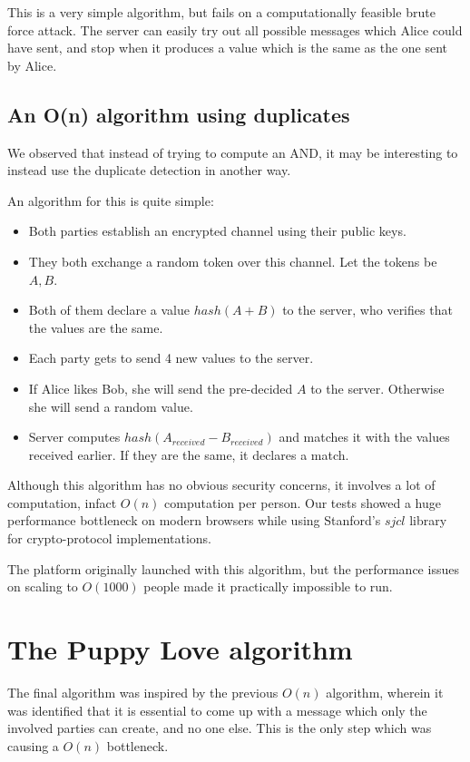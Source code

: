 \documentclass[sigtbd]{sigtbd-style}
\begin{document}
This is a very simple algorithm, but fails on a computationally
feasible brute force attack. The server can easily try out all
possible messages which Alice could have sent, and stop when it
produces a value which is the same as the one sent by Alice.

\subsection{An O(n) algorithm using duplicates}
We observed that instead of trying to compute an AND, it may be
interesting to instead use the duplicate detection in another way.

An algorithm for this is quite simple:
\begin{itemize}
\item Both parties establish an encrypted channel using their public
  keys.
\item They both exchange a random token over this channel. Let the
  tokens be $A, B$.
\item Both of them declare a value $hash(A+B)$ to the server, who
  verifies that the values are the same.
\item Each party gets to send 4 new values to the server.
\item If Alice likes Bob, she will send the pre-decided $A$ to the
  server. Otherwise she will send a random value.
\item Server computes $hash(A_{received}-B_{received})$ and matches it
  with the values received earlier. If they are the same, it declares
  a match.
\end{itemize}

Although this algorithm has no obvious security concerns, it involves
a lot of computation, infact $O(n)$ computation per person. Our tests
showed a huge performance bottleneck on modern browsers while using
Stanford's $sjcl$ library for crypto-protocol implementations.

The platform originally launched with this algorithm, but the
performance issues on scaling to $O(1000)$ people made it practically
impossible to run.

\section{The Puppy Love algorithm}
The final algorithm was inspired by the previous $O(n)$ algorithm,
wherein it was identified that it is essential to come up with a
message which only the involved parties can create, and no one
else. This is the only step which was causing a $O(n)$ bottleneck.
\end{document}
